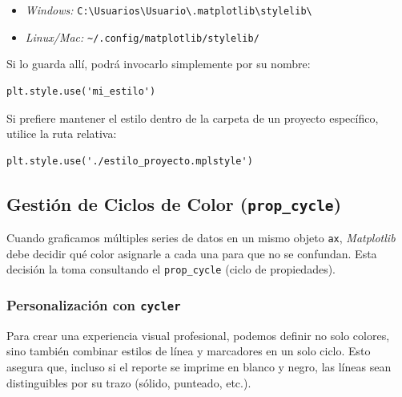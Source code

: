 \begin{itemize}
\item \textit{Windows:} \texttt{C:\textbackslash Usuarios\textbackslash Usuario\textbackslash .matplotlib\textbackslash stylelib\textbackslash}
\item \textit{Linux/Mac:} \texttt{\textasciitilde/.config/matplotlib/stylelib/}
\end{itemize}

Si lo guarda allí, podrá invocarlo simplemente por su nombre:
\begin{verbatim}
plt.style.use('mi_estilo')
\end{verbatim}

Si prefiere mantener el estilo dentro de la carpeta de un proyecto específico, utilice la ruta relativa:
\begin{verbatim}
plt.style.use('./estilo_proyecto.mplstyle')
\end{verbatim}




\subsection{Gestión de Ciclos de Color (\texttt{prop\_cycle})}

Cuando graficamos múltiples series de datos en un mismo objeto \texttt{ax}, \textit{Matplotlib} debe decidir qué color asignarle a cada una para que no se confundan. Esta decisión la toma consultando el \texttt{prop\_cycle} (ciclo de propiedades).

\subsubsection{Personalización con \texttt{cycler}}

Para crear una experiencia visual profesional, podemos definir no solo colores, sino también combinar estilos de línea y marcadores en un solo ciclo. Esto asegura que, incluso si el reporte se imprime en blanco y negro, las líneas sean distinguibles por su trazo (sólido, punteado, etc.).


